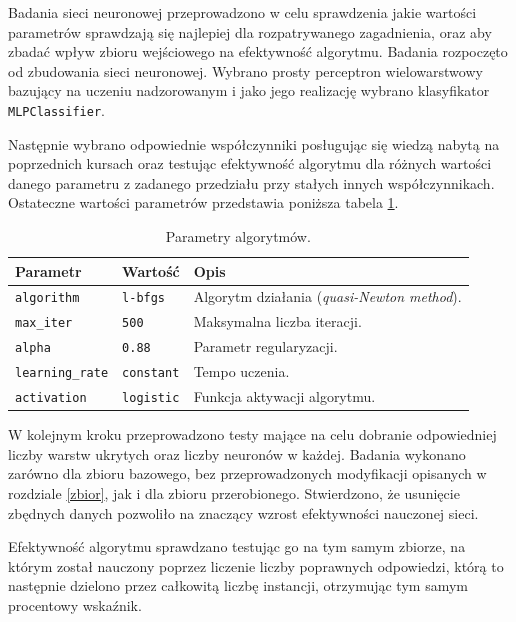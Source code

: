 Badania sieci neuronowej przeprowadzono w celu sprawdzenia jakie wartości parametrów sprawdzają się najlepiej dla rozpatrywanego zagadnienia, oraz aby zbadać wpływ zbioru wejściowego na efektywność algorytmu. Badania rozpoczęto od zbudowania sieci neuronowej. Wybrano prosty perceptron wielowarstwowy bazujący na uczeniu nadzorowanym i jako jego realizację wybrano klasyfikator \texttt{MLPClassifier}.

Następnie wybrano odpowiednie współczynniki posługując się wiedzą nabytą na poprzednich kursach oraz testując efektywność algorytmu dla różnych wartości danego parametru z zadanego przedziału przy stałych innych współczynnikach. Ostateczne wartości parametrów przedstawia poniższa tabela \ref{tab:params}.

\begin{table}[h!]
    \centering
    \caption{Parametry algorytmów.}
    \label{tab:params}
    \begin{tabular}{p{3cm}p{3cm}p{9cm}}
        \toprule
        \textbf{Parametr} & \textbf{Wartość} & \textbf{Opis} \\
        \midrule
        \texttt{algorithm} & \texttt{l-bfgs} & Algorytm działania (\textit{quasi-Newton method}). \\
        \texttt{max\_iter} & \texttt{500} & Maksymalna liczba iteracji. \\
        \texttt{alpha} & \texttt{0.88} & Parametr regularyzacji. \\
        \texttt{learning\_rate} & \texttt{constant} & Tempo uczenia. \\
        \texttt{activation} & \texttt{logistic} & Funkcja aktywacji algorytmu. \\
        \bottomrule
    \end{tabular}
\end{table}

W kolejnym kroku przeprowadzono testy mające na celu dobranie odpowiedniej liczby warstw ukrytych oraz liczby neuronów w każdej. Badania wykonano zarówno dla zbioru bazowego, bez przeprowadzonych modyfikacji opisanych w rozdziale \ref{zbior}, jak i dla zbioru przerobionego. Stwierdzono, że usunięcie zbędnych danych pozwoliło na znaczący wzrost efektywności nauczonej sieci.

Efektywność algorytmu sprawdzano testując go na tym samym zbiorze, na którym został nauczony poprzez liczenie liczby poprawnych odpowiedzi, którą to następnie dzielono przez całkowitą liczbę instancji, otrzymując tym samym procentowy wskaźnik.

